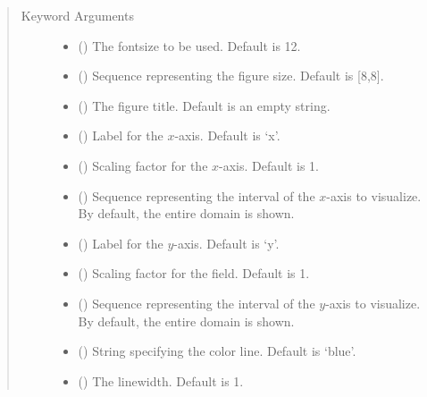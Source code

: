 \documentclass[letterpaper,10pt,english]{sphinxmanual}
\begin{document}
\begin{fulllineitems}
\begin{quote}
\begin{description}
\item[{Keyword Arguments}] \leavevmode\begin{itemize}
\item {} 
 () \textendash{} The fontsize to be used. Default is 12.

\item {} 
 () \textendash{} Sequence representing the figure size. Default is {[}8,8{]}.

\item {} 
 () \textendash{} The figure title. Default is an empty string.

\item {} 
 () \textendash{} Label for the \(x\)-axis. Default is ‘x’.

\item {} 
 () \textendash{} Scaling factor for the \(x\)-axis. Default is 1.

\item {} 
 () \textendash{} Sequence representing the interval of the \(x\)-axis to visualize.
By default, the entire domain is shown.

\item {} 
 () \textendash{} Label for the \(y\)-axis. Default is ‘y’.

\item {} 
 () \textendash{} Scaling factor for the field. Default is 1.

\item {} 
 () \textendash{} Sequence representing the interval of the \(y\)-axis to visualize.
By default, the entire domain is shown.

\item {} 
 () \textendash{} String specifying the color line. Default is ‘blue’.

\item {} 
 () \textendash{} The linewidth. Default is 1.


\end{itemize}
\end{description}
\end{quote}
\end{fulllineitems}
\end{document}
